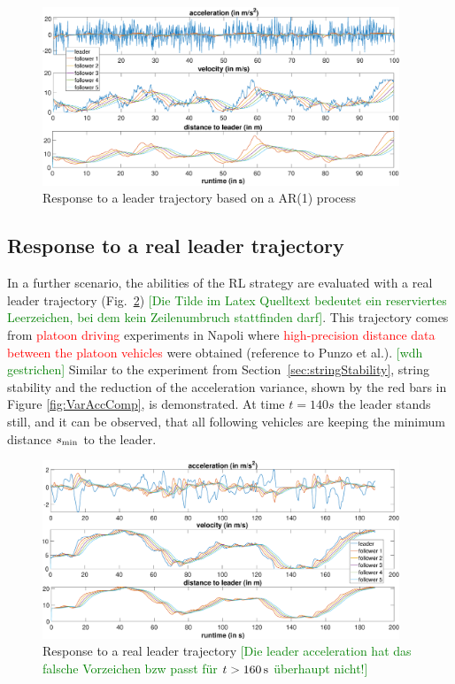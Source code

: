 \documentclass[review]{elsarticle}
\providecommand{\red}[1]{\textcolor{red}{#1}}
\providecommand{\green}[1]{\textcolor{green}{#1}}
\providecommand{\martin}[1]{\red{#1}} %
\providecommand{\martinc}[1]{\green{[#1]}} %
\providecommand{\3}{{\ss}}
\begin{document}
\begin{figure}
	\centering
	\includegraphics[width=0.95\textwidth]{images/AR1Kolonne}
	\caption{Response to a leader trajectory based on a AR(1) process}
	\label{fig:AR1Kolonne}
\end{figure}


\subsection{Response to a real leader trajectory}

In a further scenario, the abilities of the RL strategy are evaluated
with a real leader trajectory (Fig.~\ref{fig:PunzoKolonne})
\martinc{Die Tilde im Latex Quelltext bedeutet ein reserviertes
  Leerzeichen, bei dem kein Zeilenumbruch stattfinden darf}. This
trajectory comes from \martin{platoon driving} experiments in Napoli
where \martin{high-precision distance data between the platoon
vehicles} were obtained (reference to Punzo et al.). \martinc{wdh
  gestrichen} Similar to the experiment from
Section~\ref{sec:stringStability}, string stability and the reduction
of  the acceleration variance, shown by the red bars in Figure
\ref{fig:VarAccComp}, is demonstrated. At time $t = 140s$ the leader
stands still, and it can be observed, that all following vehicles are
keeping the minimum distance $s_{\rm min}$ to the leader.  


\begin{figure}
	\centering
	\includegraphics[width=0.95\textwidth]{images/PunzoKolonne}
	\caption{Response to a real leader trajectory \martinc{Die
            leader acceleration hat das falsche Vorzeichen bzw passt
            f\"ur $t>\unit[160]{s}$ \"uberhaupt nicht!}}
	\label{fig:PunzoKolonne}
\end{figure}
\end{document}
